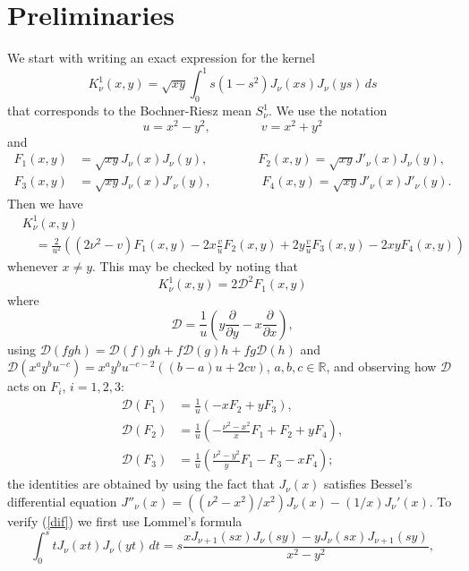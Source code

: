 \documentclass[leqno,a4paper]{amsart}
\newcommand{\R}{\mathbb{R}}
\begin{document}
\section{Preliminaries}

We start with writing an exact expression for the kernel
$$
K^{1}_{\nu}(x,y) = \sqrt{xy}\int_0^1 s(1-s^2)J_\nu(xs)J_\nu(ys)\, ds
$$
that corresponds to the Bochner-Riesz mean $S_\nu^1$. We use the notation
$$
u=x^2-y^2,\qquad\qquad v=x^2+y^2
$$
and
\begin{align*}
F_1(x,y) &= \sqrt{xy}J_\nu(x)J_\nu(y),\qquad\qquad
F_2(x,y) = \sqrt{xy}J'_\nu(x)J_\nu(y),\\
F_3(x,y) &= \sqrt{xy}J_\nu(x)J'_\nu(y),\qquad\qquad
F_4(x,y) = \sqrt{xy}J'_\nu(x)J'_\nu(y).
\end{align*}
Then we have
\begin{align}
\label{Cam}
&K_\nu^1(x,y) \\
\nonumber
&\quad= \frac{2}{u^{2}} \left((2\nu^2-v)F_1(x,y)-2x\frac vuF_2(x,y)
+ 2y\frac vuF_3(x,y)-2xyF_4(x,y)\right)
\end{align}
whenever $x\neq y$. This may be checked by noting that
\begin{equation}
\label{dif}
K^1_\nu(x,y) = 2\mathcal{D}^{2}F_1(x,y)
\end{equation}
where
\begin{equation*}
\mathcal{D} = \frac{1}{u}\left(y\frac{\partial}{\partial y}
-x\frac{\partial}{\partial x}\right),
\end{equation*}
using $\mathcal{D}(fgh) = \mathcal{D}(f)gh+f\mathcal{D}(g)h+fg\mathcal{D}(h)$
and $\mathcal{D}(x^ay^bu^{-c})=x^ay^bu^{-c-2}((b-a)u+2cv)$, $a,b,c\in\R$,
and observing how $\mathcal{D}$ acts on $F_i$, $i=1,2,3$:
\begin{align*}
\mathcal{D}(F_1) &= \frac1 u(-x F_2+ y F_3),\\
\mathcal{D}(F_2) &= \frac1u\left(-\frac{\nu^2-x^2}{x}F_1+ F_2+ y F_4\right),\\
\mathcal{D}(F_3) &= \frac1u\left(\frac{\nu^2-y^2}{y}F_1- F_3- x F_4\right);
\end{align*}
the identities are obtained by using the fact that $J_\nu(x)$ satisfies
Bessel's differential equation $J''_\nu(x) = ((\nu^2-x^2)/x^2)J_\nu(x)-
(1/x)J_\nu'(x)$. To verify (\ref{dif}) we first use Lommel's formula
\begin{equation*}
\int_0^stJ_{\nu}(xt)J_{\nu}(yt)\,dt
= s\frac{xJ_{\nu+1}(sx)J_{\nu}(sy)-yJ_{\nu}(sx)J_{\nu+1}(sy)}{x^2-y^2},
\end{equation*}
\end{document}
